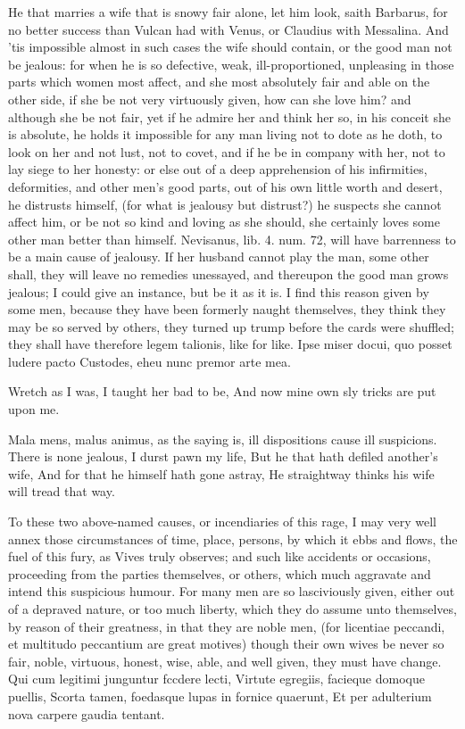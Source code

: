 {He that marries a wife that is snowy fair alone, let him look, saith
 Barbarus, for no better success than Vulcan had with Venus, or
Claudius with Messalina. And 'tis impossible almost in such cases the
wife should contain, or the good man not be jealous: for when he is so
defective, weak, ill-proportioned, unpleasing in those parts which
women most affect, and she most absolutely fair and able on the other
side, if she be not very virtuously given, how can she love him? and
although she be not fair, yet if he admire her and think her so, in his
conceit she is absolute, he holds it impossible for any man living not
to dote as he doth, to look on her and not lust, not to covet, and if
he be in company with her, not to lay siege to her honesty: or else out
of a deep apprehension of his infirmities, deformities, and other men's
good parts, out of his own little worth and desert, he distrusts
himself, (for what is jealousy but distrust?) he suspects she cannot
affect him, or be not so kind and loving as she should, she certainly
loves some other man better than himself.
Nevisanus, lib. 4. num. 72, will have barrenness to be a main
cause of jealousy. If her husband cannot play the man, some other
shall, they will leave no remedies unessayed, and thereupon the good
man grows jealous; I could give an instance, but be it as it is.
I find this reason given by some men, because they have been formerly
naught themselves, they think they may be so served by others, they
turned up trump before the cards were shuffled; they shall have
therefore legem talionis, like for like.
Ipse miser docui, quo posset ludere pacto
Custodes, eheu nunc premor arte mea.

Wretch as I was, I taught her bad to be,
And now mine own sly tricks are put upon me.

Mala mens, malus animus, as the saying is, ill dispositions cause ill
suspicions.
There is none jealous, I durst pawn my life,
But he that hath defiled another's wife,
And for that he himself hath gone astray,
He straightway thinks his wife will tread that way.

To these two above-named causes, or incendiaries of this rage, I may
very well annex those circumstances of time, place, persons, by which
it ebbs and flows, the fuel of this fury, as Vives truly
observes; and such like accidents or occasions, proceeding from the
parties themselves, or others, which much aggravate and intend this
suspicious humour. For many men are so lasciviously given, either out
of a depraved nature, or too much liberty, which they do assume unto
themselves, by reason of their greatness, in that they are noble men,
(for licentiae peccandi, et multitudo peccantium are great motives)
though their own wives be never so fair, noble, virtuous, honest, wise,
able, and well given, they must have change.
Qui cum legitimi junguntur fccdere lecti,
Virtute egregiis, facieque domoque puellis,
Scorta tamen, foedasque lupas in fornice quaerunt,
Et per adulterium nova carpere gaudia tentant.

}
